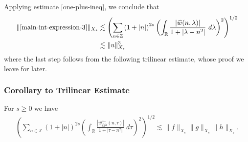 \documentclass[handout]{beamer}
\numberwithin{equation}{section}
\newcommand{\rr}{\mathbb{R}}
\newcommand{\zz}{\mathbb{Z}}
\newcommand{\wh}{\widehat}
\begin{document}
%
%
\begin{frame}
Applying estimate \eqref{one-plus-ineq}, we conclude that
%
\begin{equation}
	\label{main-int3-est}
	\begin{split}
		\| \eqref{main-int-expression-3} \|_{X_s}
		& \lesssim \left( \sum_{n \in \zz} \left(1 + |n| \right)^{2s}  \left ( \int_\rr
		\frac{|\wh{w}(n, \lambda)| }{1 + |\lambda - n^{2 }|}
		 \ d\lambda \right )^2 \right)^{1/2}
		 \\
		& \lesssim \|u\|_{X_s}^3
	\end{split}
\end{equation}
%
where the last step follows from the following trilinear estimate, whose proof we
leave for later.

\end{frame}
%
%
%
%
%
%
%
\begin{frame}

\subsubsection{Corollary to Trilinear Estimate}
%
\begin{corollary}
	\label{prop:trilinear-estimate2}
	For $s \ge 0$ we have
%
%
\begin{equation}
	\label{trilinear-estimate2}
	\begin{split}
		\left( \sum_{n \in \zz} \left(1 + |n| \right)^{2s}  \left ( \int_\rr 
		\frac{|\wh{w_{fgh}}(n, \tau) |}{1 + | \tau - n^{2 } |}
		 \ d\tau \right)^2  \right)^{1/2} \lesssim \|f\|_{X_s} \|g\|_{X_s}\|h\|_{X_s}.
	\end{split}
\end{equation}
%
%
\end{corollary}

\end{frame}
\end{document}
